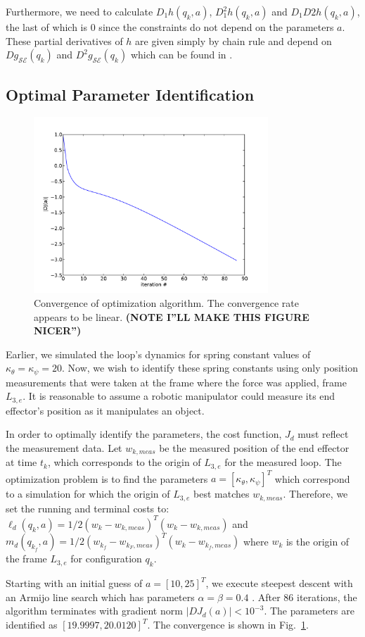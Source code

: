 \documentclass[letterpaper, 10pt, conference]{ieeeconf}
\begin{document}
Furthermore, we need to calculate $D_1h(q_k,a)$, $D_1^2h(q_k,a)$ and $D_1D2h(q_k,a)$, the last of which is $0$ since the constraints do not depend on the parameters $a$.  These partial derivatives of $h$ are given simply by chain rule and depend on $Dg_{\mathcal{S}\mathcal{E}}(q_k)$ and $D^2g_{\mathcal{S}\mathcal{E}}(q_k)$ which can be found in \cite{johnson_murphey_linearization}.  

\subsection{Optimal Parameter Identification}
\begin{figure}
\centering
\includegraphics[width = 250pt]{convergence.pdf}
\caption{Convergence of optimization algorithm. The convergence rate appears to be linear.  \textbf{(NOTE I''LL MAKE THIS FIGURE NICER'')}}
\label{fig-conv}
\end{figure}
Earlier, we simulated the loop's dynamics for spring constant values of $\kappa_\theta = \kappa_\psi = 20$.  Now, we wish to identify these spring constants using only position measurements that were taken at the frame where the force was applied, frame $L_{3,e}$.  It is reasonable to assume a robotic manipulator could measure its end effector's position as it manipulates an object.  

In order to optimally identify the parameters, the cost function, $J_d$ must reflect the measurement data.  Let $w_{k,meas}$ be the measured position of the end effector at time $t_k$, which corresponds to the origin of $L_{3,e}$ for the measured loop.  The optimization problem is to find the parameters $a = [\kappa_\theta,\kappa_\psi]^T$ which correspond to a simulation for which the origin of $L_{3,e}$ best matches $w_{k,meas}$. Therefore, we set the running and terminal costs to: $\ell_d(q_k,a) = 1/2(w_k-w_{k,meas})^T(w_k-w_{k,meas})$ and $m_d(q_{k_f},a) =  1/2(w_{k_f}-w_{k_F,meas})^T(w_{k}-w_{{k_f},meas})$ where $w_k$ is the origin of the frame $L_{3,e}$ for configuration $q_k$.

Starting with an initial guess of $a = [10, 25]^T$, we execute steepest descent with an Armijo line search which has parameters $\alpha = \beta = 0.4$ \cite{armijo}.  After $86$ iterations, the algorithm terminates with gradient norm $|DJ_d(a)| < 10^{-3}$.  The parameters are identified as $[19.9997,  20.0120]^T$.  The convergence is shown in Fig.~\ref{fig-conv}.






\end{document}
